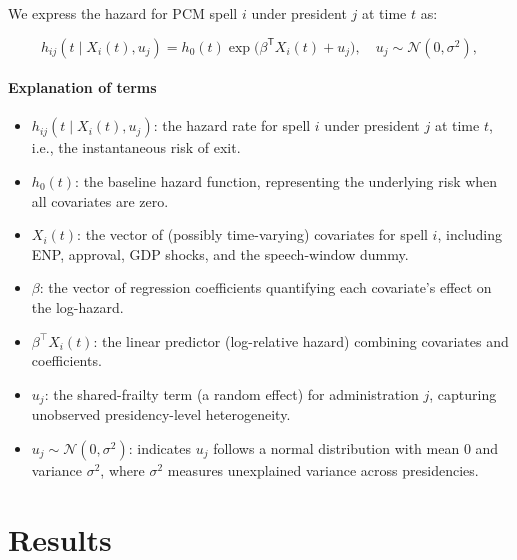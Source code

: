 \documentclass[a4paper, 12pt]{article}
\begin{document}
We express the hazard for PCM spell \(i\) under president \(j\) at time \(t\) as:

\[
  h_{ij}(t \mid X_i(t), u_j)
    = h_0(t) \exp\bigl(\beta^{\mathsf{T}}X_i(t) + u_j\bigr),
  \quad u_j \sim \mathcal{N}(0,\sigma^2),
\]


\paragraph{Explanation of terms}
\begin{itemize}
  \item $h_{ij}(t \mid X_i(t), u_j)$: the hazard rate for spell $i$ under president $j$ at time $t$, i.e., the instantaneous risk of exit.
  \item $h_0(t)$: the baseline hazard function, representing the underlying risk when all covariates are zero.
  \item $X_i(t)$: the vector of (possibly time-varying) covariates for spell $i$, including ENP, approval, GDP shocks, and the speech-window dummy.
  \item $\beta$: the vector of regression coefficients quantifying each covariate’s effect on the log-hazard.
  \item $\beta^\top X_i(t)$: the linear predictor (log-relative hazard) combining covariates and coefficients.
  \item $u_j$: the shared-frailty term (a random effect) for administration $j$, capturing unobserved presidency-level heterogeneity.
  \item $u_j \sim \mathcal{N}(0,\sigma^2)$: indicates $u_j$ follows a normal distribution with mean 0 and variance $\sigma^2$, where $\sigma^2$ measures unexplained variance across presidencies.
\end{itemize}










\section{Results}
\end{document}
